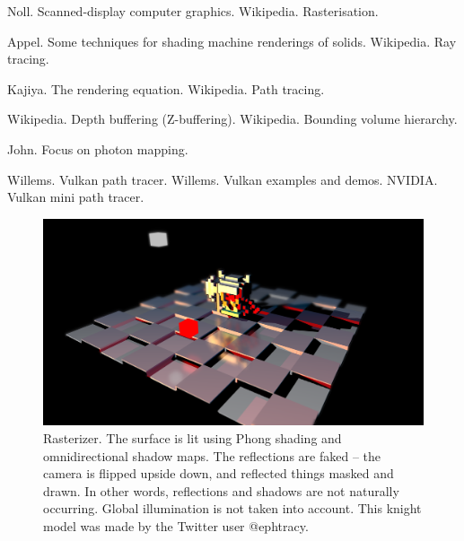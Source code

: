 \documentclass[12pt]{article}
\begin{document}
\begin{thebibliography}{9}

 Noll. Scanned-display computer graphics.
 Wikipedia. Rasterisation.

 Appel. Some techniques for shading machine renderings of solids.
 Wikipedia. Ray tracing.

 Kajiya. The rendering equation.
 Wikipedia. Path tracing.

 Wikipedia. Depth buffering (Z-buffering).
 Wikipedia. Bounding volume hierarchy.

 John. Focus on photon mapping.

 Willems. Vulkan path tracer.
 Willems. Vulkan examples and demos.
 NVIDIA. Vulkan mini path tracer.



\end{thebibliography}


\pagebreak




\begin{figure} 
\centering
  \includegraphics[width = 6 in]{rasterizer.png}
  \caption{ Rasterizer.
The surface is lit using Phong shading and omnidirectional shadow maps.
The reflections are faked -- the camera is flipped upside down, and reflected things masked and drawn.
In other words, reflections and shadows are not naturally occurring.
Global illumination is not taken into account.
This knight model was made by the Twitter user @ephtracy.
}

\end{figure}
\end{document}

